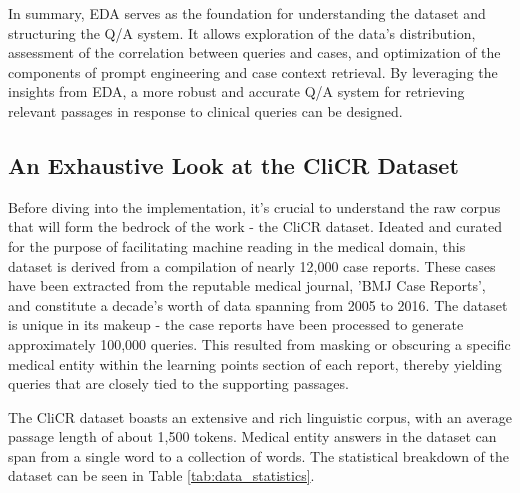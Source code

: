 \documentclass[onecolumn, conference]{IEEEtran}
\begin{document}
In summary, EDA serves as the foundation for understanding the dataset and structuring the Q/A system. It allows exploration of the data's distribution, assessment of the correlation between queries and cases, and optimization of the components of prompt engineering and case context retrieval. By leveraging the insights from EDA, a more robust and accurate Q/A system for retrieving relevant passages in response to clinical queries can be designed.

\subsection{An Exhaustive Look at the CliCR Dataset}

Before diving into the implementation, it's crucial to understand the raw corpus that will form the bedrock of the work - the CliCR dataset. Ideated and curated for the purpose of facilitating machine reading in the medical domain, this dataset is derived from a compilation of nearly 12,000 case reports. These cases have been extracted from the reputable medical journal, 'BMJ Case Reports', and constitute a decade’s worth of data spanning from 2005 to 2016. The dataset is unique in its makeup - the case reports have been processed to generate approximately 100,000 queries. This resulted from masking or obscuring a specific medical entity within the learning points section of each report, thereby yielding queries that are closely tied to the supporting passages.

The CliCR dataset boasts an extensive and rich linguistic corpus, with an average passage length of about 1,500 tokens. Medical entity answers in the dataset can span from a single word to a collection of words. The statistical breakdown of the dataset can be seen in Table \ref{tab:data_statistics}.
\end{document}
